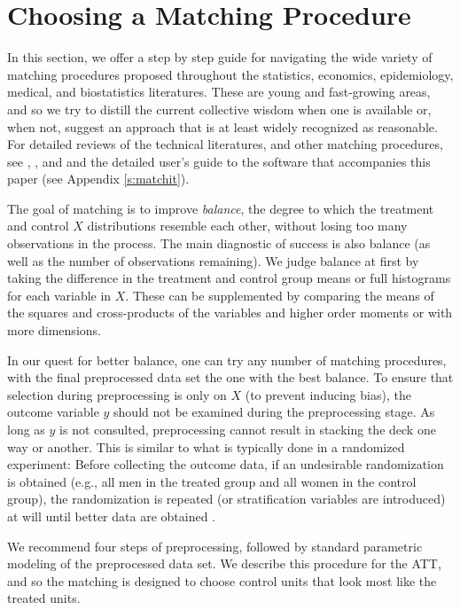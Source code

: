 \documentclass[11pt,titlepage]{article}
\begin{document}
\section{Choosing a Matching Procedure}\label{s:choose}

In this section, we offer a step by step guide for navigating the wide
variety of matching procedures proposed throughout the statistics,
economics, epidemiology, medical, and biostatistics literatures.
These are young and fast-growing areas, and so we try to distill the
current collective wisdom when one is available or, when not, suggest
an approach that is at least widely recognized as reasonable.  For
detailed reviews of the technical literatures, and other matching
procedures, see \citet{Imbens04}, \citet{Rosenbaum02}, and
\citet{Stuart04} and the detailed user's guide to the software that
accompanies this paper (see Appendix \ref{s:matchit}).

The goal of matching is to improve \emph{balance}, the degree to which
the treatment and control $X$ distributions resemble each other,
without losing too many observations in the process.  The main
diagnostic of success is also balance (as well as the number of
observations remaining).  We judge balance at first by taking the
difference in the treatment and control group means or full histograms
for each variable in $X$.  These can be supplemented by comparing the
means of the squares and cross-products of the variables and higher
order moments or with more dimensions.

In our quest for better balance, one can try any number of matching
procedures, with the final preprocessed data set the one with the best
balance.  To ensure that selection during preprocessing is only on $X$
(to prevent inducing bias), the outcome variable $y$ should not be
examined during the preprocessing stage.  As long as $y$ is not
consulted, preprocessing cannot result in stacking the deck one way or
another.  This is similar to what is typically done in a randomized
experiment: Before collecting the outcome data, if an undesirable
randomization is obtained (e.g., all men in the treated group and all
women in the control group), the randomization is repeated (or
stratification variables are introduced) at will until better data are
obtained \citep[see][]{Rubin01}.

We recommend four steps of preprocessing, followed by standard
parametric modeling of the preprocessed data set.  We describe this
procedure for the ATT, and so the matching is designed to choose
control units that look most like the treated units.
\end{document}
